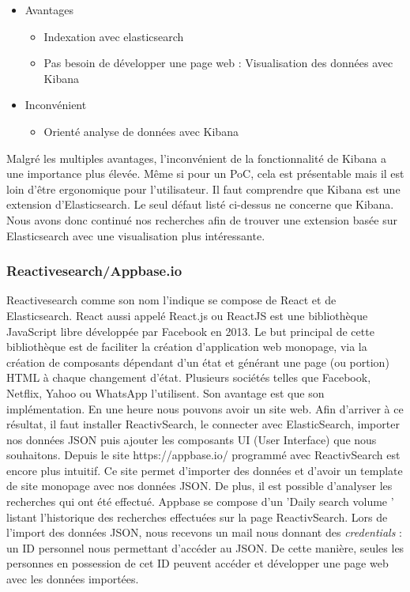\begin{itemize}
    \item Avantages 
        \begin{itemize}
            \item Indexation avec elasticsearch
            \item Pas besoin de développer une page web : Visualisation des données avec Kibana
        \end{itemize}
    \item Inconvénient 
        \begin{itemize}
        \item Orienté analyse de données avec Kibana
        \end{itemize}
\end{itemize}

Malgré les multiples avantages, l’inconvénient de la fonctionnalité de Kibana a une importance plus élevée. Même si pour un PoC, cela est présentable mais il est loin d’être ergonomique pour l’utilisateur.
Il faut comprendre que Kibana est une extension d’Elasticsearch. Le seul défaut listé ci-dessus ne concerne que Kibana. Nous avons donc continué nos recherches afin de trouver une extension basée sur Elasticsearch avec une visualisation plus intéressante.

\subsubsection{Reactivesearch/Appbase.io}

Reactivesearch comme son nom l’indique se compose de React et de Elasticsearch. React aussi appelé React.js ou ReactJS est une bibliothèque JavaScript libre développée par Facebook en 2013. Le but principal de cette bibliothèque est de faciliter la création d’application web monopage, via la création de composants dépendant d'un état et générant une page (ou portion) HTML à chaque changement d'état.
Plusieurs sociétés telles que Facebook, Netflix, Yahoo ou WhatsApp l’utilisent. Son avantage est que son implémentation. En une heure nous pouvons avoir un site web. Afin d’arriver à ce résultat, il faut installer ReactivSearch, le connecter avec ElasticSearch, importer nos données JSON puis ajouter les composants UI (User Interface) que nous souhaitons. 
Depuis le site https://appbase.io/ programmé avec ReactivSearch est encore plus intuitif. Ce site permet d’importer des données et d’avoir un template de site monopage avec nos données JSON. De plus, il est possible d’analyser les recherches qui ont été effectué. Appbase se compose d’un 'Daily search volume ' listant l’historique des recherches effectuées sur la page ReactivSearch. 
Lors de l’import des données JSON, nous recevons un mail nous donnant des \textit{credentials} : un ID personnel nous permettant d’accéder au JSON. De cette manière, seules les personnes en possession de cet ID peuvent accéder et développer une page web avec les données importées. 

